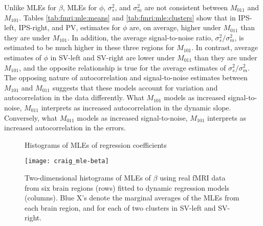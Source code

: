 Unlike MLEs for $\beta$, MLEs for $\phi$, $\sigma^2_s$, and $\sigma^2_m$ are not consistent between $M_{011}$ and $M_{101}$. Tables \ref{tab:fmri:mle:means} and \ref{tab:fmri:mle:clusters} show that in IPS-left, IPS-right, and PV, estimates for $\phi$ are, on average, higher under $M_{011}$ than they are under $M_{101}$.  In addition, the average signal-to-noise ratio, $\sigma^2_s / \sigma^2_m$, is estimated to be much higher in these three regions for $M_{101}$. In contrast, average estimates of $\phi$ in SV-left and SV-right are lower under $M_{011}$ than they are under $M_{101}$, and the opposite relationship is true for the average estimates of $\sigma^2_s / \sigma^2_m$. The opposing nature of autocorrelation and signal-to-noise estimates between $M_{101}$ and $M_{011}$ suggests that these models account for variation and autocorrelation in the data differently. What $M_{101}$ models as increased signal-to-noise, $M_{011}$ interprets as increased autocorrelation in the dynamic slope. Conversely, what $M_{011}$ models as increased signal-to-noise, $M_{101}$ interprets as increased autocorrelation in the errors.


\begin{figure}
\ssp
\centering
\caption{Histograms of MLEs of regression coefficients} \label{fig:fmri:mle:beta}
\texttt{[image: craig\_mle-beta]}
\caption*{Two-dimensional histograms of MLEs of $\beta$ using real fMRI data from six brain regions (rows) fitted to dynamic regression models (columns). Blue X's denote the marginal averages of the MLEs from each brain region, and for each of two clusters in SV-left and SV-right.}
\end{figure}

